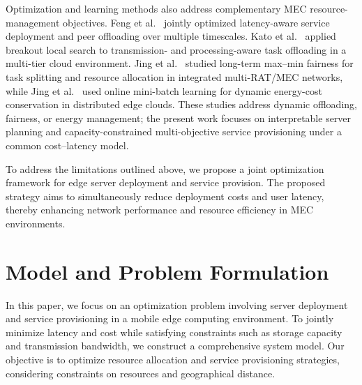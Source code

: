 \documentclass[10pt, conference, letterpaper]{IEEEtran}
\newenvironment{revision}{\begingroup\color{blue}}{\endgroup}
\newenvironment{revision}{\begingroup}{\endgroup}
\begin{document}
\begin{revision}
Optimization and learning methods also address complementary MEC resource-management objectives. Feng et al.~\cite{b33} jointly optimized latency-aware service deployment and peer offloading over multiple timescales. Kato et al.~\cite{b34} applied breakout local search to transmission- and processing-aware task offloading in a multi-tier cloud environment. Jing et al.~\cite{b35} studied long-term max--min fairness for task splitting and resource allocation in integrated multi-RAT/MEC networks, while Jing et al.~\cite{b36} used online mini-batch learning for dynamic energy-cost conservation in distributed edge clouds. These studies address dynamic offloading, fairness, or energy management; the present work focuses on interpretable server planning and capacity-constrained multi-objective service provisioning under a common cost--latency model.
\end{revision}

To address the limitations outlined above, we propose a joint optimization framework for edge server deployment and service provision. The proposed strategy aims to simultaneously reduce deployment costs and user latency, thereby enhancing network performance and resource efficiency in MEC environments.

\section{Model and Problem Formulation}
In this paper, we focus on an optimization problem involving server deployment and service provisioning in a mobile edge computing environment. To jointly minimize latency and cost while satisfying constraints such as storage capacity and transmission bandwidth, we construct a comprehensive system model. Our objective is to optimize resource allocation and service provisioning strategies, considering constraints on resources and geographical distance. 
\end{document}
